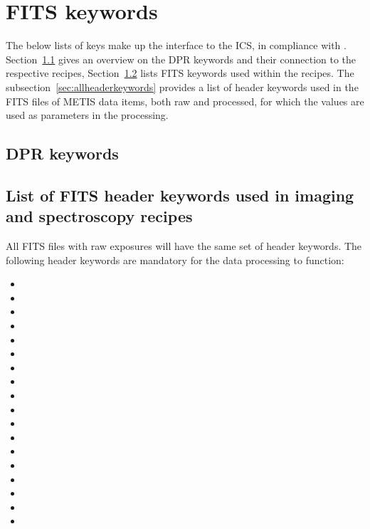 \section{FITS keywords}
\label{app:fits_keywords}

The below lists of keys make up the interface to the \ac{ICS}, in compliance with . Section~\ref{sec:dprkeywords} gives an overview on the \ac{DPR} keywords and their connection to the respective recipes, Section~\ref{sec:essentialimagingheaders} lists \ac{FITS} keywords used within the recipes. The subsection~\ref{sec:allheaderkeywords} provides a list of header keywords used in the FITS files of METIS data items, both raw and processed, for which the values are used as parameters in the processing.
\subsection{DPR keywords}\label{sec:dprkeywords}

%

\subsection{List of FITS header keywords used in imaging and spectroscopy recipes}
\label{sec:essentialimagingheaders}


All FITS files with raw exposures will have the same set of header keywords.
The following header keywords are mandatory for the data processing to function:
\begin{itemize}
    \setlength{\itemsep}{0pt}
        \item {}
    \item {}
    \item {}
    \item {}
    \item {}
    \item {}
    \item {}
    \item {}
    \item {}
    \item {}
    \item {}
    \item {}
    \item {}
    \item {}
    \item {}
    \item {}
    \item {}
    \item {}

\end{itemize}

